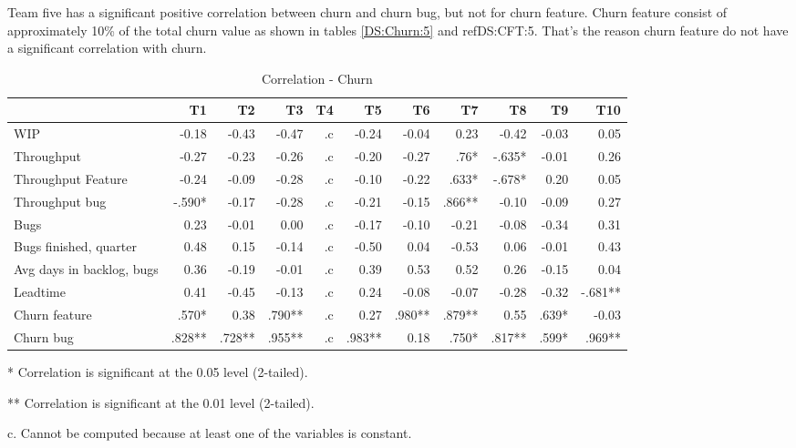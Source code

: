 \documentclass[UKenglish]{ifimaster}  %
\begin{document}
Team five has a significant positive correlation between churn and churn bug, but not for churn feature.  Churn feature consist of approximately 10\% of the total churn value as shown in tables \ref{DS:Churn:5} and ref{DS:CFT:5}. That's the reason churn feature do not have a significant correlation with churn.   
\begin{table}[!htbp]
 \begin{adjustwidth}{-2.5cm}{}

 \centering
 \begin{tabular}{|l|r|r|r|r|r|r|r|r|r|r|}
\hline
 & T1 & T2 & T3 & T4 & T5 & T6 & T7 & T8 & T9 & T10\\ \hline
WIP &-0.18& -0.43& -0.47& .c& -0.24& -0.04& 0.23& -0.42& -0.03& 0.05\\ \hline
Throughput &-0.27& -0.23& -0.26& .c& -0.20& -0.27& .76*& -.635*& -0.01& 0.26\\ \hline
Throughput Feature &-0.24& -0.09& -0.28& .c& -0.10& -0.22& .633*& -.678*& 0.20& 0.05\\ \hline
Throughput bug &-.590*& -0.17& -0.28& .c& -0.21& -0.15& .866**& -0.10& -0.09& 0.27\\ \hline
Bugs &0.23& -0.01& 0.00& .c& -0.17& -0.10& -0.21& -0.08& -0.34& 0.31\\ \hline
Bugs finished, quarter &0.48& 0.15& -0.14& .c& -0.50& 0.04& -0.53& 0.06& -0.01& 0.43\\ \hline
Avg days in backlog, bugs &0.36& -0.19& -0.01& .c& 0.39& 0.53& 0.52& 0.26& -0.15& 0.04\\ \hline
Leadtime &0.41& -0.45& -0.13& .c& 0.24& -0.08& -0.07& -0.28& -0.32& -.681**\\ \hline
Churn feature &.570*& 0.38& .790**& .c& 0.27& .980**& .879**& 0.55& .639*& -0.03\\ \hline
Churn bug &.828**
& .728**
& .955**
& .c& .983**
& 0.18& .750*
& .817**
& .599*
& .969**
\\ \hline
\end{tabular}
 \caption{Correlation - Churn}
 \label{corr:churn}
 \centerline {* Correlation is significant at the 0.05 level (2-tailed).}
\centerline{** Correlation is significant at the 0.01 level (2-tailed).}
\centerline{c. Cannot be computed because at least one of the variables is constant.}
\end{adjustwidth}
\end{table}
\end{document}
